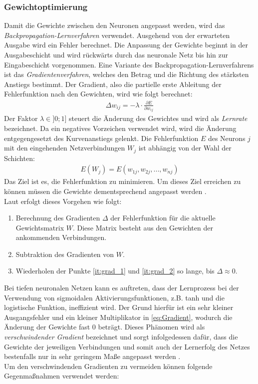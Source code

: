 \documentclass[12pt,a4paper,bibliography=totocnumbered,listof=totocnumbered]{article}
\begin{document}
\subsubsection{Gewichtoptimierung} \label{sec:gewichtopt}
Damit die Gewichte zwischen den Neuronen angepasst werden, wird das \emph{Backpropagation-Lernverfahren} verwendet. Ausgehend von der erwarteten Ausgabe wird ein Fehler berechnet. Die Anpassung der Gewichte beginnt in der Ausgabeschicht und wird rückwärts durch das neuronale Netz bis hin zur Eingabeschicht vorgenommen. Eine Variante des Backpropagation-Lernverfahrens ist das \emph{Gradientenverfahren}, welches den Betrag und die Richtung des stärksten Anstiegs bestimmt. Der Gradient, also die partielle erste Ableitung der Fehlerfunktion nach den Gewichten, wird wie folgt berechnet:
\begin{align}
\Delta w_{ij} = -\lambda \cdot \frac{\partial E}{\partial w_{ij}}
\end{align}
Der Faktor $\lambda \in ]0;1]$ steuert die Änderung des Gewichtes und wird als \emph{Lernrate} bezeichnet. Da ein negatives Vorzeichen verwendet wird, wird die Änderung entgegengesetzt des Kurvenanstiegs gelenkt. Die Fehlerfunktion $E$ des Neurons $j$ mit den eingehenden Netzverbindungen $W_{j}$ ist abhängig von der Wahl der Schichten:
\begin{align}
E(W_{j}) = E(w_{1j}, w_{2j}, ... , w_{nj})
\label{eq:Gradient}
\end{align}
Das Ziel ist es, die Fehlerfunktion zu minimieren. Um dieses Ziel erreichen zu können müssen die Gewichte dementsprechend angepasst werden \citep[S. 212ff.]{UweLammel.2020}.\\
Laut \citep[Kapitel 5.4.4]{Ferguson.2019} erfolgt dieses Vorgehen wie folgt:
\begin{enumerate}
\item Berechnung des Gradienten $\Delta$ der Fehlerfunktion für die aktuelle Gewichtsmatrix $W$. Diese Matrix besteht aus den Gewichten der ankommenden Verbindungen. \label{it:grad_1}
\item Subtraktion des Gradienten von $W$. \label{it:grad_2}
\item Wiederholen der Punkte \ref{it:grad_1} und \ref{it:grad_2} so lange, bis $\Delta \approx 0$. 
\end{enumerate}
Bei tiefen neuronalen Netzen kann es auftreten, dass der Lernprozess bei der Verwendung von sigmoidalen Aktivierungsfunktionen, z.B. tanh und die logistische Funktion, ineffizient wird. Der Grund hierfür ist ein sehr kleiner Ausgangsfehler und ein kleiner Multiplikator in \autoref{eq:Gradient}, wodurch die Änderung der Gewichte fast 0 beträgt. Dieses Phänomen wird als \emph{verschwindender Gradient} bezeichnet und sorgt infolgedessen dafür, dass die Gewichte der jeweiligen Verbindungen und somit auch der Lernerfolg des Netzes bestenfalls nur in sehr geringem Maße angepasst werden \citep[S. 134]{Kubat.2021}.\\ Um den verschwindenden Gradienten zu vermeiden können folgende Gegenmaßnahmen verwendet werden:
\end{document}
